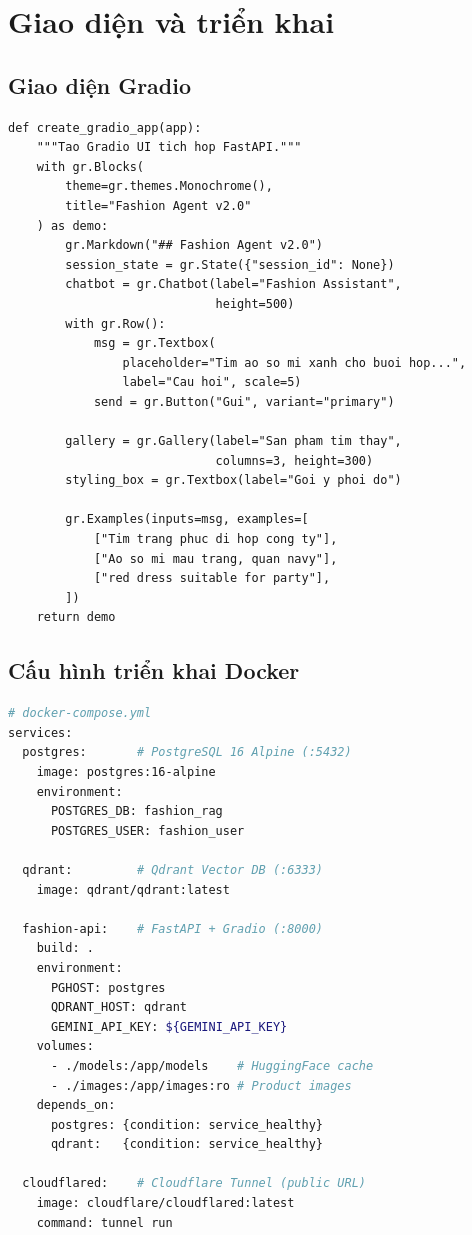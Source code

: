 \documentclass[12pt,a4paper]{report}
\begin{document}
\chapter{Giao diện và triển khai}

\section{Giao diện Gradio}

\begin{lstlisting}[caption={Gradio Chat Interface --- api/main.py}]
def create_gradio_app(app):
    """Tao Gradio UI tich hop FastAPI."""
    with gr.Blocks(
        theme=gr.themes.Monochrome(),
        title="Fashion Agent v2.0"
    ) as demo:
        gr.Markdown("## Fashion Agent v2.0")
        session_state = gr.State({"session_id": None})
        chatbot = gr.Chatbot(label="Fashion Assistant",
                             height=500)
        with gr.Row():
            msg = gr.Textbox(
                placeholder="Tim ao so mi xanh cho buoi hop...",
                label="Cau hoi", scale=5)
            send = gr.Button("Gui", variant="primary")

        gallery = gr.Gallery(label="San pham tim thay",
                             columns=3, height=300)
        styling_box = gr.Textbox(label="Goi y phoi do")

        gr.Examples(inputs=msg, examples=[
            ["Tim trang phuc di hop cong ty"],
            ["Ao so mi mau trang, quan navy"],
            ["red dress suitable for party"],
        ])
    return demo
\end{lstlisting}

\section{Cấu hình triển khai Docker}

\begin{lstlisting}[language=bash,caption={Docker Compose --- 4 services}]
# docker-compose.yml
services:
  postgres:       # PostgreSQL 16 Alpine (:5432)
    image: postgres:16-alpine
    environment:
      POSTGRES_DB: fashion_rag
      POSTGRES_USER: fashion_user

  qdrant:         # Qdrant Vector DB (:6333)
    image: qdrant/qdrant:latest

  fashion-api:    # FastAPI + Gradio (:8000)
    build: .
    environment:
      PGHOST: postgres
      QDRANT_HOST: qdrant
      GEMINI_API_KEY: ${GEMINI_API_KEY}
    volumes:
      - ./models:/app/models    # HuggingFace cache
      - ./images:/app/images:ro # Product images
    depends_on:
      postgres: {condition: service_healthy}
      qdrant:   {condition: service_healthy}

  cloudflared:    # Cloudflare Tunnel (public URL)
    image: cloudflare/cloudflared:latest
    command: tunnel run
\end{lstlisting}
\end{document}
